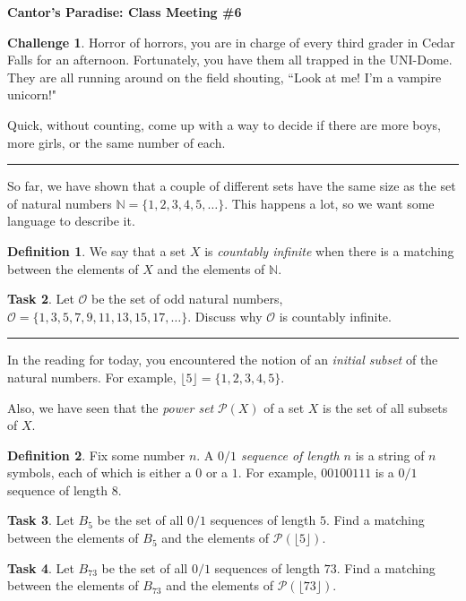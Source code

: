 \documentclass[12pt]{amsart}
\theoremstyle{definition}
\newtheorem{task}{Task}
\newtheorem{challenge}[task]{Challenge}
\newtheorem*{definition}{Definition}
\begin{document}
\begin{center}
\textbf{\Huge
Cantor's Paradise: Class Meeting \#6
}
\end{center}


\vspace{.5in}

\begin{challenge}
Horror of horrors, you are in charge of every third grader in Cedar Falls for an afternoon.
Fortunately, you have them all trapped in the UNI-Dome.
They are all running around on the field shouting, ``Look at me! I'm a vampire unicorn!"

Quick, without counting, come up with a way to decide if there are more boys, more girls, or the same number of each.
\end{challenge}

\vspace{.1in}
\hrule
\vspace{.1in}

So far, we have shown that a couple of different sets have the same size as the set of natural numbers $\mathbb{N} = \{1, 2, 3, 4, 5, \dots\}$. 
This happens a lot, so we want some language to describe it. 

\begin{definition} 
We say that a set $X$ is \emph{countably infinite} when there is a matching between the elements of $X$ and the elements of $\mathbb{N}$.
\end{definition}

\begin{task} Let $\mathcal{O}$ be the set of odd natural numbers, 
$\mathcal{O} = \{ 1, 3, 5, 7, 9, 11, 13, 15, 17, \dots\}$. 
Discuss why $\mathcal{O}$ is countably infinite.\\
\end{task}

\vspace{.1in}
\hrule
\vspace{.1in}

In the reading for today, you encountered the notion of an \emph{initial subset} of the natural numbers. 
For example, $\lfloor 5 \rfloor = \{1, 2, 3, 4, 5\}$.

Also, we have seen that the \emph{power set} $\mathcal{P}(X)$ of a set $X$ is the set of all subsets of $X$.

\begin{definition} 
Fix some number $n$. A \emph{$0/1$ sequence of length $n$} is a string of $n$ symbols, each of which is either a $0$ or a $1$.
For example, $00100111$ is a $0/1$ sequence of length $8$.
\end{definition}

\begin{task}
Let $B_5$ be the set of all $0/1$ sequences of length $5$. 
Find a matching between the elements of $B_5$ and the elements of $\mathcal{P}(\lfloor 5 \rfloor)$.
\end{task}

\begin{task}
Let $B_{73}$ be the set of all $0/1$ sequences of length $73$. 
Find a matching between the elements of $B_{73}$ and the elements of $\mathcal{P}(\lfloor 73 \rfloor)$.
\end{task}
\end{document}
